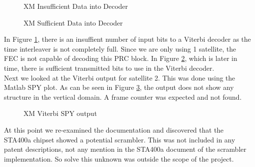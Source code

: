 \documentclass[conference,onecolumn]{IEEEtran}
\begin{document}
\begin{figure}[H]
	\centerline{}
	\caption{XM Insufficient Data into Decoder}
	\label{fig::Viterbi_1}
\end{figure}
\begin{figure}[H]
	\centerline{}
	\caption{XM Sufficient Data into Decoder}
	\label{fig::Viterbi_2}
\end{figure}

In Figure \ref{fig::Viterbi_1}, there is an insuffient number of input bits to a Viterbi decoder as the time interleaver is not completely full.  Since we are only using 1 satellite, the FEC is not capable of decoding this PRC block.  In Figure \ref{fig::Viterbi_2}, which is later in time, there is sufficient transmitted bits to use in the Viterbi decoder.\\

Next we looked at the Viterbi output for satellite 2.  This was done using the Matlab SPY plot.  As can be seen in Figure \ref{fig::Viterbi_spy}, the output does not show any structure in the vertical domain.  A frame counter was expected and not found.  
\begin{figure}[H]
	\centerline{}
	\caption{XM Viterbi SPY output}
	\label{fig::Viterbi_spy}
\end{figure}
At this point we re-examined the documentation and discovered that the STA400a chipset showed a potential scrambler.  This was not included in any patent descriptions, not any mention in the STA400a document of the scrambler implementation.  So solve this unknown was outside the scope of the project.
\end{document}
